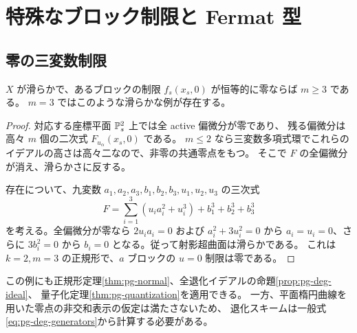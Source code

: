 \section{特殊なブロック制限と Fermat 型}\label{sec:pg-special}
\subsection{零の三変数制限}
\begin{proposition}\label{prop:pg-zero-restriction}
$X$ が滑らかで、あるブロックの制限 $f_s(x_s,0)$ が恒等的に零ならば $m\geq3$ である。
$m=3$ ではこのような滑らかな例が存在する。
\end{proposition}
\begin{proof}
対応する座標平面 $\mathbb P_s^2$ 上では全 active 偏微分が零であり、
残る偏微分は高々 $m$ 個の二次式 $F_{u_\alpha}(x_s,0)$ である。
$m\leq2$ なら三変数多項式環でこれらのイデアルの高さは高々二なので、非零の共通零点をもつ。
そこで $F$ の全偏微分が消え、滑らかさに反する。

存在について、九変数 $a_1,a_2,a_3,b_1,b_2,b_3,u_1,u_2,u_3$ の三次式
\begin{equation}\label{eq:pg-zero-restriction-example}
F=\sum_{i=1}^3(u_i a_i^2+u_i^3)+b_1^3+b_2^3+b_3^3
\end{equation}
を考える。全偏微分が零なら $2u_ia_i=0$ および $a_i^2+3u_i^2=0$ から
$a_i=u_i=0$、さらに $3b_i^2=0$ から $b_i=0$ となる。従って射影超曲面は滑らかである。
これは $k=2,m=3$ の正規形で、$a$ ブロックの $u=0$ 制限は零である。
\end{proof}
この例にも正規形定理\ref{thm:pg-normal}、全退化イデアルの命題\ref{prop:pg-deg-ideal}、
量子化定理\ref{thm:pg-quantization}を適用できる。
一方、平面楕円曲線を用いた零点の非交和表示の仮定は満たさないため、
退化スキームは一般式\eqref{eq:pg-deg-generators}から計算する必要がある。

